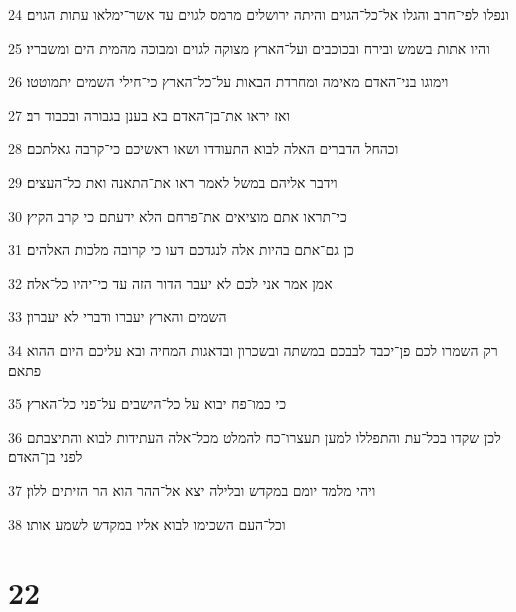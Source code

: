 \par 24 ונפלו לפי־חרב והגלו אל־כל־הגוים והיתה ירושלים מרמס לגוים עד אשר־ימלאו עתות הגוים׃
\par 25 והיו אתות בשמש ובירח ובכוכבים ועל־הארץ מצוקה לגוים ומבוכה מהמית הים ומשבריו׃
\par 26 וימוגו בני־האדם מאימה ומחרדת הבאות על־כל־הארץ כי־חילי השמים יתמוטטו׃
\par 27 ואז יראו את־בן־האדם בא בענן בגבורה ובכבוד רב׃
\par 28 וכהחל הדברים האלה לבוא התעודדו ושאו ראשיכם כי־קרבה גאלתכם׃
\par 29 וידבר אליהם במשל לאמר ראו את־התאנה ואת כל־העצים׃
\par 30 כי־תראו אתם מוציאים את־פרחם הלא ידעתם כי קרב הקיץ׃
\par 31 כן גם־אתם בהיות אלה לנגדכם דעו כי קרובה מלכות האלהים׃
\par 32 אמן אמר אני לכם לא יעבר הדור הזה עד כי־יהיו כל־אלה׃
\par 33 השמים והארץ יעברו ודברי לא יעברון׃
\par 34 רק השמרו לכם פן־יכבד לבבכם במשתה ובשכרון ובדאגות המחיה ובא עליכם היום ההוא פתאם׃
\par 35 כי כמו־פח יבוא על כל־הישבים על־פני כל־הארץ׃
\par 36 לכן שקדו בכל־עת והתפללו למען תעצרו־כח להמלט מכל־אלה העתידות לבוא והתיצבתם לפני בן־האדם׃
\par 37 ויהי מלמד יומם במקדש ובלילה יצא אל־ההר הוא הר הזיתים ללון׃
\par 38 וכל־העם השכימו לבוא אליו במקדש לשמע אותו׃

\chapter{22}

